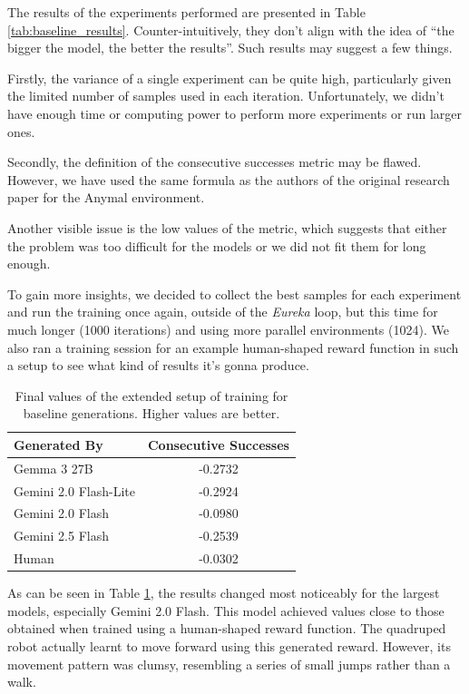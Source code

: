 \documentclass[10pt,twocolumn]{article}
\begin{document}
The results of the experiments performed are presented in Table \ref{tab:baseline_results}. Counter-intuitively, they don't align with the idea of ``the bigger the model, the better the results''. Such results may suggest a few things.

Firstly, the variance of a single experiment can be quite high, particularly given the limited number of samples used in each iteration. Unfortunately, we didn't have enough time or computing power to perform more experiments or run larger ones.

Secondly, the definition of the consecutive successes metric may be flawed. However, we have used the same formula as the authors of the original research paper for the Anymal environment.

Another visible issue is the low values of the metric, which suggests that either the problem was too difficult for the models or we did not fit them for long enough.

To gain more insights, we decided to collect the best samples for each experiment and run the training once again, outside of the \textit{Eureka} loop, but this time for much longer (1000 iterations) and using more parallel environments (1024). We also ran a training session for an example human-shaped reward function in such a setup to see what kind of results it's gonna produce.

\begin{table}
    \centering
    \begin{tabular}{|l|c|}
        \hline
        Generated By              & Consecutive Successes \\
        \hline
        Gemma 3 27B               & -0.2732               \\
        Gemini 2.0 Flash-Lite     & -0.2924               \\
        Gemini 2.0 Flash          & -0.0980               \\
        Gemini 2.5 Flash          & -0.2539               \\
        Human                     & -0.0302               \\
        \hline
    \end{tabular}
    \caption{Final values of the extended setup of training for baseline generations. Higher values are better.}
    \label{tab:baseline_results_extended}
\end{table}

As can be seen in Table \ref{tab:baseline_results_extended}, the results changed most noticeably for the largest models, especially Gemini 2.0 Flash. This model achieved values close to those obtained when trained using a human-shaped reward function. The quadruped robot actually learnt to move forward using this generated reward. However, its movement pattern was clumsy, resembling a series of small jumps rather than a walk.
\end{document}
